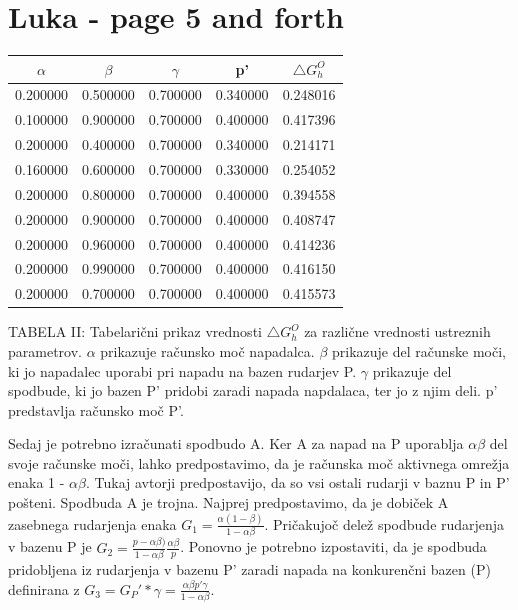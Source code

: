 \documentclass{acm_proc_article-sp}
\begin{document}
\newpage

\section{Luka - page 5 and forth}


\begin{center}
  \begin{tabular}{ | c | c | c | c | c | }
    \hline
    $\alpha$ & $\beta$ & $\gamma$ & p' & $\bigtriangleup G_h^O $  \\ \hline
    0.200000 & 0.500000 & 0.700000 & 0.340000 & 0.248016 \\ \hline
    0.100000 & 0.900000 & 0.700000 & 0.400000 & 0.417396 \\ \hline
    0.200000 & 0.400000 & 0.700000 & 0.340000 & 0.214171 \\ \hline
    0.160000 & 0.600000 & 0.700000 & 0.330000 & 0.254052 \\ \hline
    0.200000 & 0.800000 & 0.700000 & 0.400000 & 0.394558 \\ \hline
    0.200000 & 0.900000 & 0.700000 & 0.400000 & 0.408747 \\ \hline
    0.200000 & 0.960000 & 0.700000 & 0.400000 & 0.414236 \\ \hline
    0.200000 & 0.990000 & 0.700000 & 0.400000 & 0.416150 \\ \hline
    0.200000 & 0.700000 & 0.700000 & 0.400000 & 0.415573 \\ \hline
  \end{tabular}
\end{center}
TABELA II: Tabelarični prikaz vrednosti $\bigtriangleup G_h^O $ za različne vrednosti ustreznih parametrov. $\alpha$ prikazuje računsko moč napadalca. $\beta$ prikazuje del računske moči, ki jo napadalec uporabi pri napadu na bazen rudarjev P. $\gamma$ prikazuje del spodbude, ki jo bazen P' pridobi zaradi napada napdalaca, ter jo z njim deli. p' predstavlja računsko moč P'.
\newline
\newline

Sedaj je potrebno izračunati spodbudo A. Ker A za napad na P uporablja $\alpha\beta$ del svoje računske moči, lahko predpostavimo, da je računska moč aktivnega omrežja enaka 1 - $\alpha\beta$. Tukaj avtorji predpostavijo\cite{originalarticle}, da so vsi ostali rudarji v baznu P in P' pošteni. Spodbuda A je trojna. Najprej predpostavimo, da je dobiček A zasebnega rudarjenja enaka $ G_1 = \frac{\alpha(1 - \beta)}{ 1 - \alpha\beta}$. Pričakujoč delež spodbude rudarjenja v bazenu P je $ G_2 = \frac{p - \alpha\beta)}{ 1 - \alpha\beta} \frac{\alpha\beta}{p}$. Ponovno je potrebno izpostaviti, da je spodbuda pridobljena iz rudarjenja v bazenu P' zaradi napada na konkurenčni bazen (P) definirana z $ G_3 = G_P' * \gamma = \frac{\alpha\beta p' \gamma}{1 - \alpha\beta} $. 
\end{document}
